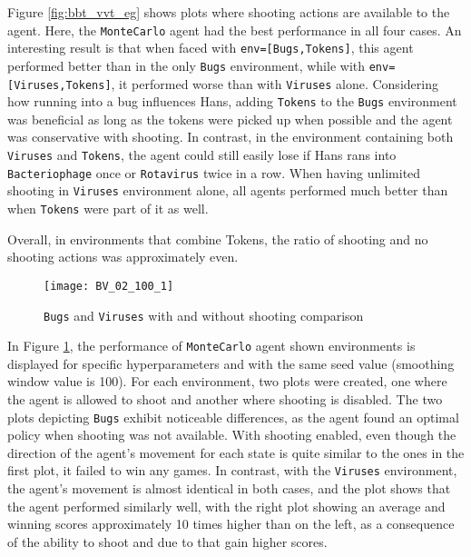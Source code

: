 Figure \ref{fig:bbt_vvt_eg} shows plots where shooting actions are available to the agent. Here, the \texttt{MonteCarlo} agent had the best performance in all four cases. An interesting result is that when faced with \texttt{env=[Bugs,Tokens]}, this agent performed better than in the only \texttt{Bugs} environment, while with \texttt{env=[Viruses,Tokens]}, it performed worse than with \texttt{Viruses} alone. Considering how running into a bug influences Hans, adding \texttt{Tokens} to the \texttt{Bugs} environment was beneficial as long as the tokens were picked up when possible and the agent was conservative with shooting. In contrast, in the environment containing both \texttt{Viruses} and \texttt{Tokens}, the agent could still easily lose if Hans rans into \texttt{Bacteriophage} once or \texttt{Rotavirus} twice in a row. When having unlimited shooting in \texttt{Viruses} environment alone, all agents performed much better than when \texttt{Tokens} were part of it as well.

Overall, in environments that combine Tokens, the ratio of shooting and no shooting actions was approximately even. 

\begin{figure}[h]
    \centering
    \texttt{[image: BV\_02\_100\_1]}
    \caption{\texttt{Bugs} and \texttt{Viruses} with and without shooting comparison}
    \label{fig:BV_02_100_1_eg}
\end{figure}


In Figure \ref{fig:BV_02_100_1_eg}, the performance of \texttt{MonteCarlo} agent shown environments is displayed for specific hyperparameters and with the same seed value (smoothing window value is 100). For each environment, two plots were created, one where the agent is allowed to shoot and another where shooting is disabled. The two plots depicting \texttt{Bugs} exhibit noticeable differences, as the agent found an optimal policy when shooting was not available. With shooting enabled, even though the direction of the agent's movement for each state is quite similar to the ones in the first plot, it failed to win any games. In contrast, with the \texttt{Viruses} environment, the agent's movement is almost identical in both cases, and the plot shows that the agent performed similarly well, with the right plot showing an average and winning scores approximately 10 times higher than on the left, as a consequence of the ability to shoot and due to that gain higher scores.

